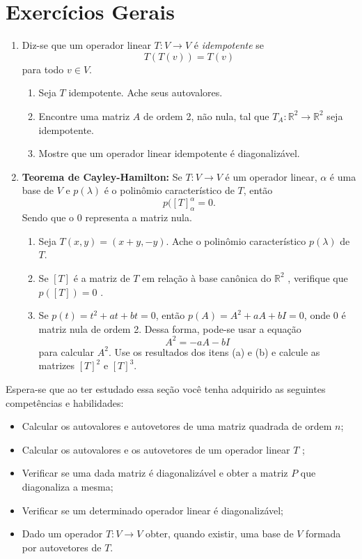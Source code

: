 \section{Exercícios Gerais}
\begin{enumerate}

\item  Diz-se que  um operador linear $T:V  \rightarrow V$ é \textit{idempotente} se $$T(T(v))=T(v)$$ para todo $v \in V$.

\begin{enumerate}[label=(\alph*)]
\item Seja $T$ idempotente. Ache seus autovalores.
\item Encontre uma matriz $A$ de ordem 2, não nula, tal que $T_A: \mathbb{R}^2 \rightarrow \mathbb{R}^2$ seja idempotente.
\item  Mostre que um operador linear idempotente é diagonalizável.
\end{enumerate}


\item  \textbf{Teorema de Cayley-Hamilton:} Se $T:V  \rightarrow V$ é um operador linear, $\alpha$ é uma base de $V$ e $p(\lambda)$ é o polinômio característico de $T$, então $$p([T]_{\alpha}^{\alpha}=0.$$ Sendo que o $0$ representa a matriz nula.
\begin{enumerate}[label=(\alph*)]
\item Seja $T(x,y)=(x+y, -y)$. Ache o polinômio característico $p(\lambda)$ de $T$.
\item Se  $[T]$ é a matriz de $T$ em relação à base canônica do $\mathbb{R}^2$ , verifique que  $p([T])=0$ .
\item Se $p(t)=t^2+at+bt=0$, então $p(A)=A^2+aA+bI=0$, onde 0 é matriz nula de ordem 2.   Dessa forma, pode-se usar a equação $$A^2=-aA-bI$$ para calcular $A^2$. Use os resultados dos itens (a) e (b) e calcule  as matrizes $[T]^2$ e $[T]^3$.
\end{enumerate}

\end{enumerate}

Espera-se que ao ter estudado essa seção você tenha adquirido  as seguintes competências e habilidades:
\begin{itemize}
\item  Calcular  os autovalores e   autovetores  de uma matriz quadrada de ordem $n$;
\item  Calcular  os autovalores  e os autovetores  de um operador linear  $T$ ;
\item  Verificar se  uma dada matriz  é diagonalizável e obter a matriz $P$ que diagonaliza a mesma;
\item Verificar se um determinado operador linear é diagonalizável;
\item Dado um operador $T:V  \rightarrow V$ obter, quando existir, uma base de $V$ formada por autovetores de $T$.
\end{itemize}

